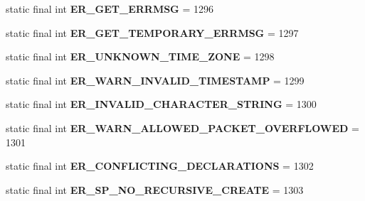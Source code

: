 \begin{DoxyCompactItemize}
static final int {\bfseries E\+R\+\_\+\+G\+E\+T\+\_\+\+E\+R\+R\+M\+SG} = 1296
\item 
\mbox{\label{classcom_1_1mysql_1_1jdbc_1_1_mysql_error_numbers_ab4ed8a3c19ad10dfea3b360c67e7041a}} 
static final int {\bfseries E\+R\+\_\+\+G\+E\+T\+\_\+\+T\+E\+M\+P\+O\+R\+A\+R\+Y\+\_\+\+E\+R\+R\+M\+SG} = 1297
\item 
\mbox{\label{classcom_1_1mysql_1_1jdbc_1_1_mysql_error_numbers_a8c27c2200debbdc392f7755c1d86ce5c}} 
static final int {\bfseries E\+R\+\_\+\+U\+N\+K\+N\+O\+W\+N\+\_\+\+T\+I\+M\+E\+\_\+\+Z\+O\+NE} = 1298
\item 
\mbox{\label{classcom_1_1mysql_1_1jdbc_1_1_mysql_error_numbers_a137c0208c6e298f342563fbab38b08c8}} 
static final int {\bfseries E\+R\+\_\+\+W\+A\+R\+N\+\_\+\+I\+N\+V\+A\+L\+I\+D\+\_\+\+T\+I\+M\+E\+S\+T\+A\+MP} = 1299
\item 
\mbox{\label{classcom_1_1mysql_1_1jdbc_1_1_mysql_error_numbers_a910e0528e6220562062924b88ca139ad}} 
static final int {\bfseries E\+R\+\_\+\+I\+N\+V\+A\+L\+I\+D\+\_\+\+C\+H\+A\+R\+A\+C\+T\+E\+R\+\_\+\+S\+T\+R\+I\+NG} = 1300
\item 
\mbox{\label{classcom_1_1mysql_1_1jdbc_1_1_mysql_error_numbers_a1ebc685a242b68f53b016e6c2d857e45}} 
static final int {\bfseries E\+R\+\_\+\+W\+A\+R\+N\+\_\+\+A\+L\+L\+O\+W\+E\+D\+\_\+\+P\+A\+C\+K\+E\+T\+\_\+\+O\+V\+E\+R\+F\+L\+O\+W\+ED} = 1301
\item 
\mbox{\label{classcom_1_1mysql_1_1jdbc_1_1_mysql_error_numbers_a027acc5715cfa14c7e7c4e0afd6086df}} 
static final int {\bfseries E\+R\+\_\+\+C\+O\+N\+F\+L\+I\+C\+T\+I\+N\+G\+\_\+\+D\+E\+C\+L\+A\+R\+A\+T\+I\+O\+NS} = 1302
\item 
\mbox{\label{classcom_1_1mysql_1_1jdbc_1_1_mysql_error_numbers_aeca19018d99174dead3411846f6f377b}} 
static final int {\bfseries E\+R\+\_\+\+S\+P\+\_\+\+N\+O\+\_\+\+R\+E\+C\+U\+R\+S\+I\+V\+E\+\_\+\+C\+R\+E\+A\+TE} = 1303

\end{DoxyCompactItemize}
